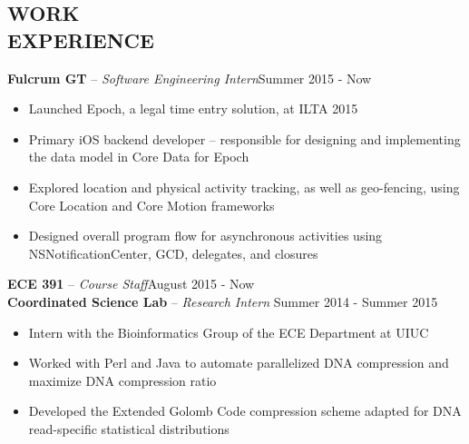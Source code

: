 \documentclass[resmargin]{res}
\begin{document}
\begin{resume}
\vspace{-3mm}
\section{WORK \\ EXPERIENCE} 
{\bf Fulcrum GT} -- {\sl Software Engineering Intern}\hfill Summer 2015 - Now
	\begin{itemize} \itemsep -2pt
	\item Launched Epoch, a legal time entry solution, at ILTA 2015
	\item Primary iOS backend developer -- responsible for designing and implementing the data model in Core Data for Epoch
	\item Explored location and physical activity tracking, as well as geo-fencing, using Core Location and Core Motion frameworks
	\item Designed overall program flow for asynchronous activities using NSNotificationCenter, GCD, delegates, and closures
	\end{itemize}
\vspace{-2mm}
{\bf ECE 391} -- {\sl Course Staff}\hfill August 2015 - Now\vspace{1mm}\\
{\bf Coordinated Science Lab} -- {\sl Research Intern }\hfill Summer 2014 - Summer 2015
                 \begin{itemize}  \itemsep -2pt %
                 \item Intern with the Bioinformatics Group of the ECE Department at UIUC 
                 \item Worked with Perl and Java to automate parallelized DNA 
                 {\mbox compression} and maximize DNA compression ratio
                 \item Developed the Extended Golomb Code compression scheme adapted for DNA read-specific statistical distributions
                \end{itemize}
 
\vspace{-4mm}

\end{resume}
\end{document}
